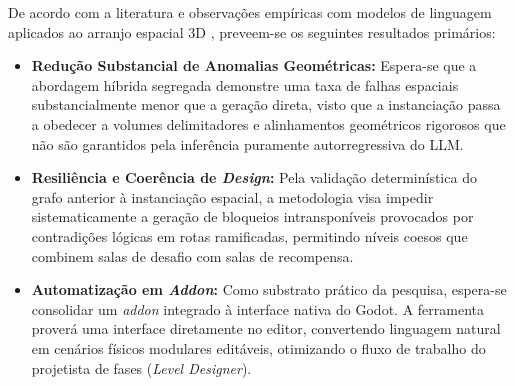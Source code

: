 De acordo com a literatura e observações empíricas com modelos de linguagem aplicados ao arranjo espacial 3D \cite{feng2026repurposing3dgenerativemodel, xu2025constraint}, preveem-se os seguintes resultados primários:

\begin{itemize}[leftmargin=*]
    \item \textbf{Redução Substancial de Anomalias Geométricas:} Espera-se que a abordagem híbrida segregada demonstre uma taxa de falhas espaciais substancialmente menor que a geração direta, visto que a instanciação passa a obedecer a volumes delimitadores e alinhamentos geométricos rigorosos que não são garantidos pela inferência puramente autorregressiva do LLM.
    \item \textbf{Resiliência e Coerência de \textit{Design}:} Pela validação determinística do grafo anterior à instanciação espacial, a metodologia visa impedir sistematicamente a geração de bloqueios intransponíveis provocados por contradições lógicas em rotas ramificadas, permitindo níveis coesos que combinem salas de desafio com salas de recompensa.
    \item \textbf{Automatização em \textit{Addon}:} Como substrato prático da pesquisa, espera-se consolidar um \textit{addon} integrado à interface nativa do Godot. A ferramenta proverá uma interface diretamente no editor, convertendo linguagem natural em cenários físicos modulares editáveis, otimizando o fluxo de trabalho do projetista de fases (\textit{Level Designer}).
\end{itemize}
